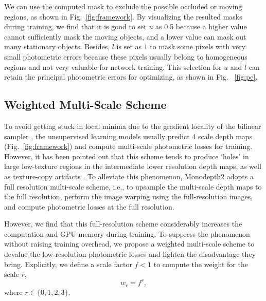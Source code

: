 \documentclass[letterpaper, 10 pt, conference]{ieeeconf}
\begin{document}
We can use the computed mask to exclude the possible occluded or moving regions, as shown in Fig.~\ref{fig:framework}. By visualizing the resulted masks during training, we find that it is good to set $u$ as 0.5 because a higher value cannot sufficiently mask the moving objects, and a lower value can mask out many stationary objects. Besides, $l$ is set as $1$ to mask some pixels with very small photometric errors because these pixels usually belong to homogeneous regions and not very valuable for network training. This selection for $u$ and $l$ can retain the principal photometric errors for optimizing, as shown in Fig. ~\ref{fig:pe}. 


\subsection{Weighted Multi-Scale Scheme}
To avoid getting stuck in local minima due to the gradient locality of the bilinear sampler \cite{jaderberg2015spatial}, the unsupervised learning models usually predict 4 scale depth maps (Fig.~\ref{fig:framework}) and compute multi-scale photometric losses for training. 
However, it has been pointed out that this scheme tends to produce `holes' in large low-texture regions in the intermediate lower resolution depth maps, as well as texture-copy artifacts \cite{godard2019digging}. 
To alleviate this phenomenon, Monodepth2 \cite{godard2019digging} adopts a full resolution multi-scale scheme, i.e., to upsample the multi-scale depth maps to the full resolution, perform the image warping using the full-resolution images, and compute photometric losses at the full resolution. 

However, we find that this full-resolution scheme considerably increases the computation and GPU memory during training.  
To suppress the phenomenon without raising training overhead, we propose a weighted multi-scale scheme to devalue the low-resolution photometric losses and lighten the disadvantage they bring. 
Explicitly, we define a scale factor $f<1$ to compute the weight for the scale $r$, 
\begin{equation}
w_r =    f^r, 
\label{eq:scale-weight}
\end{equation} 
where $r \in \{0, 1, 2, 3\}$. 
\end{document}
